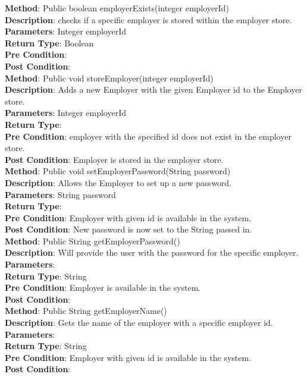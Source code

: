 \documentclass{l3deliverable}
\begin{document}
\textbf{Method}: Public boolean employerExists(integer employerId) \\
\textbf{Description}: checks if a specific employer is stored within the employer store.\\
\textbf{Parameters}: Integer employerId\\
\textbf{Return Type}: Boolean\\
\textbf{Pre Condition}:\\
\textbf{Post Condition}:\\

\textbf{Method}: Public void storeEmployer(integer employerId) \\
\textbf{Description}:  Adds a new Employer with the given Employer id to the Employer store.\\
\textbf{Parameters}: Integer employerId\\
\textbf{Return Type}:\\
\textbf{Pre Condition}: employer with the specified id does not exist in the employer store.\\
\textbf{Post Condition}: Employer is stored in the employer store.\\

\textbf{Method}: Public void setEmployerPassword(String password) \\
\textbf{Description}: Allows the Employer to set up a new password.\\
\textbf{Parameters}: String password\\
\textbf{Return Type}: \\
\textbf{Pre Condition}: Employer with given id is available in the system.\\
\textbf{Post Condition}: New password is now set to the String passed in.\\

\textbf{Method}: Public String getEmployerPassword() \\
\textbf{Description}: Will provide the user with the password for the specific employer.\\
\textbf{Parameters}:\\
\textbf{Return Type}: String \\
\textbf{Pre Condition}: Employer is available in the system.\\
\textbf{Post Condition}:\\

\textbf{Method}: Public String getEmployerName()\\
\textbf{Description}: Gets the name of the employer with a specific employer id.\\
\textbf{Parameters}:\\
\textbf{Return Type}: String\\
\textbf{Pre Condition}: Employer with given id is available in the system.\\
\textbf{Post Condition}:\\
\end{document}
